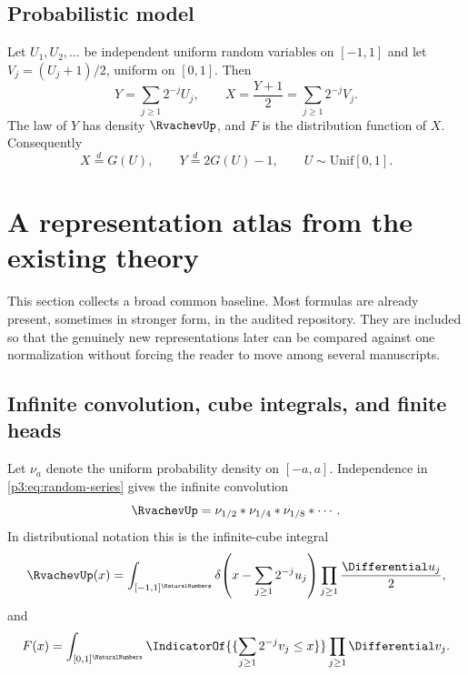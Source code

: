 \documentclass[11pt]{article}
\theoremstyle{definition}
\theoremstyle{remark}
\begin{document}
\subsection{Probabilistic model}

Let $U_1,U_2,\ldots$ be independent uniform random variables on $[-1,1]$ and
let $V_j=(U_j+1)/2$, uniform on $[0,1]$.  Then
\begin{equation}\label{p3:eq:random-series}
 Y=\sum_{j\ge1}2^{-j}U_j,\qquad
 X=\frac{Y+1}{2}=\sum_{j\ge1}2^{-j}V_j.
\end{equation}
The law of $Y$ has density $\RvachevUp$, and $F$ is the distribution function of $X$.
Consequently
\begin{equation}\label{p3:eq:quantile-push}
 X\overset d=G(U),\qquad
 Y\overset d=2G(U)-1,
 \qquad U\sim\mathrm{Unif}[0,1].
\end{equation}

\section{A representation atlas from the existing theory}
\label{p3:sec:atlas}

This section collects a broad common baseline.  Most formulas are already
present, sometimes in stronger form, in the audited repository.  They are
included so that the genuinely new representations later can be compared
against one normalization without forcing the reader to move among several
manuscripts.

\subsection{Infinite convolution, cube integrals, and finite heads}

Let $\nu_a$ denote the uniform probability density on $[-a,a]$.
Independence in \eqref{p3:eq:random-series} gives the infinite convolution
\begin{equation}\label{p3:eq:infinite-convolution}
 \RvachevUp=\nu_{1/2}*\nu_{1/4}*\nu_{1/8}*\cdots.
\end{equation}
In distributional notation this is the infinite-cube integral
\begin{equation}\label{p3:eq:delta-cube}
 \RvachevUp(x)=\int_{[-1,1]^{\NaturalNumbers}}
 \delta\!\left(x-\sum_{j\ge1}2^{-j}u_j\right)
 \prod_{j\ge1}\frac{\Differential u_j}{2},
\end{equation}
and
\begin{equation}\label{p3:eq:F-cube}
 F(x)=\int_{[0,1]^{\NaturalNumbers}}
 \IndicatorOf{\{\sum_{j\ge1}2^{-j}v_j\le x\}}
 \prod_{j\ge1}\Differential v_j.
\end{equation}
\end{document}
